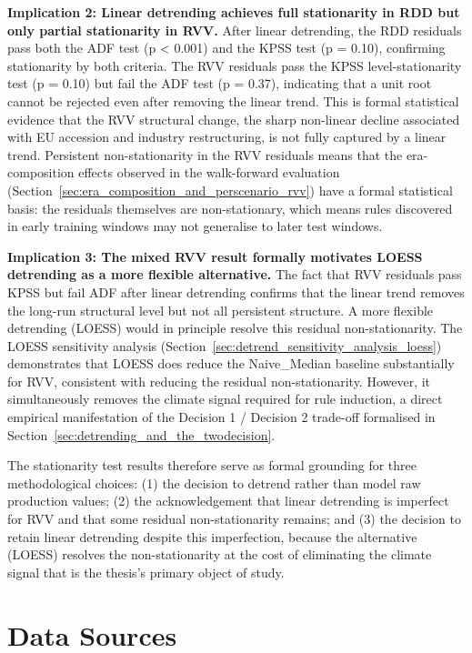 \textbf{Implication 2: Linear detrending achieves full stationarity in RDD but only partial stationarity in RVV. }After linear detrending, the RDD residuals pass both the ADF test (p < 0.001) and the KPSS test (p = 0.10), confirming stationarity by both criteria. The RVV residuals pass the KPSS level-stationarity test (p = 0.10) but fail the ADF test (p = 0.37), indicating that a unit root cannot be rejected even after removing the linear trend. This is formal statistical evidence that the RVV structural change, the sharp non-linear decline associated with EU accession and industry restructuring, is not fully captured by a linear trend. Persistent non-stationarity in the RVV residuals means that the era-composition effects observed in the walk-forward evaluation (Section~\ref{sec:era_composition_and_perscenario_rvv}) have a formal statistical basis: the residuals themselves are non-stationary, which means rules discovered in early training windows may not generalise to later test windows.

\textbf{Implication 3: The mixed RVV result formally motivates LOESS detrending as a more flexible alternative. }The fact that RVV residuals pass KPSS but fail ADF after linear detrending confirms that the linear trend removes the long-run structural level but not all persistent structure. A more flexible detrending (LOESS) would in principle resolve this residual non-stationarity. The LOESS sensitivity analysis (Section~\ref{sec:detrend_sensitivity_analysis_loess}) demonstrates that LOESS does reduce the Naive\_Median baseline substantially for RVV, consistent with reducing the residual non-stationarity. However, it simultaneously removes the climate signal required for rule induction, a direct empirical manifestation of the Decision 1 / Decision 2 trade-off formalised in Section~\ref{sec:detrending_and_the_twodecision}.

The stationarity test results therefore serve as formal grounding for three methodological choices: (1) the decision to detrend rather than model raw production values; (2) the acknowledgement that linear detrending is imperfect for RVV and that some residual non-stationarity remains; and (3) the decision to retain linear detrending despite this imperfection, because the alternative (LOESS) resolves the non-stationarity at the cost of eliminating the climate signal that is the thesis's primary object of study.



\section{Data Sources}\label{sec:data_sources}

